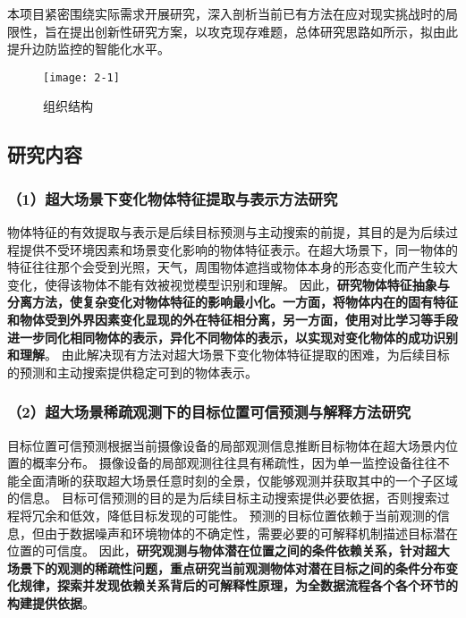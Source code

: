 
本项目紧密围绕实际需求开展研究，深入剖析当前已有方法在应对现实挑战时的局限性，旨在提出创新性研究方案，以攻克现存难题，总体研究思路如所示，拟由此提升边防监控的智能化水平。

\begin{figure}[h!]
\centering %
\texttt{[image: 2-1]}
\captionsetup{justification=centering}
\caption{组织结构}
\label{fig:organization}
\end{figure}

\subsection{研究内容}



\subsubsection*{\bfseries （1）超大场景下变化物体特征提取与表示方法研究}
物体特征的有效提取与表示是后续目标预测与主动搜索的前提，其目的是为后续过程提供不受环境因素和场景变化影响的物体特征表示。在超大场景下，同一物体的特征往往那个会受到光照，天气，周围物体遮挡或物体本身的形态变化而产生较大变化，使得该物体不能有效被视觉模型识别和理解。
因此，\textbf{研究物体特征抽象与分离方法，使复杂变化对物体特征的影响最小化。一方面，将物体内在的固有特征和物体受到外界因素变化显现的外在特征相分离，另一方面，使用对比学习等手段进一步同化相同物体的表示，异化不同物体的表示，以实现对变化物体的成功识别和理解}。
由此解决现有方法对超大场景下变化物体特征提取的困难，为后续目标的预测和主动搜索提供稳定可到的物体表示。


\subsubsection*{\bfseries （2）超大场景稀疏观测下的目标位置可信预测与解释方法研究}
目标位置可信预测根据当前摄像设备的局部观测信息推断目标物体在超大场景内位置的概率分布。
摄像设备的局部观测往往具有稀疏性，因为单一监控设备往往不能全面清晰的获取超大场景任意时刻的全景，仅能够观测并获取其中的一个子区域的信息。
目标可信预测的目的是为后续目标主动搜索提供必要依据，否则搜索过程将冗余和低效，降低目标发现的可能性。
预测的目标位置依赖于当前观测的信息，但由于数据噪声和环境物体的不确定性，需要必要的可解释机制描述目标潜在位置的可信度。
因此，\textbf{研究观测与物体潜在位置之间的条件依赖关系，针对超大场景下的观测的稀疏性问题，重点研究当前观测物体对潜在目标之间的条件分布变化规律，探索并发现依赖关系背后的可解释性原理，为全数据流程各个各个环节的构建提供依据}。


